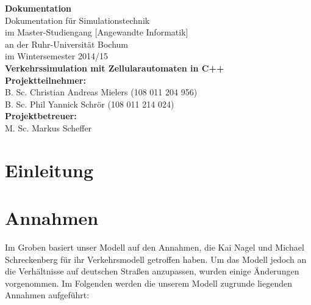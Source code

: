 \documentclass[11pt, a4paper]{article}
\begin{document}
\thispagestyle{empty}


\setlength{\hoffset}{-0.5cm} %

\begin{titlepage}
    \begin{center}
    \vphantom{0cm}
    \LARGE \textbf{Dokumentation}\\
    \vspace{3cm}
    \normalsize
    Dokumentation für Simulationstechnik \\
    im Master-Studiengang \textcolor{AI-BLUE}{[Angewandte Informatik]}\\
    an der Ruhr-Universität Bochum\\
    im Wintersemester 2014/15\\
    \vspace{4cm}
    \huge \textbf{Verkehrssimulation mit Zellularautomaten in C++} \\
    \vspace{4cm}
    \normalsize
    \textbf{Projektteilnehmer:}\\
    B. Sc. Christian Andreas Mielers (108 011 204 956)\\
    B. Sc. Phil Yannick Schrör (108 011 214 024)\\
    \vspace{2cm}
    \textbf{Projektbetreuer:}\\
    M. Sc. Markus Scheffer
    \end{center}
\end{titlepage}

\newpage
\tableofcontents

\newpage
{}

\section{Einleitung}
\label{sec:einleitung}

\newpage
\section{Annahmen}
\label{sec:ansatz}

Im Groben basiert unser Modell auf den Annahmen, die Kai Nagel und Michael Schreckenberg \cite{nagel-schreckenberg} für ihr Verkehrsmodell getroffen haben. Um das Modell jedoch an die Verhältnisse auf deutschen Straßen anzupassen, wurden einige Änderungen vorgenommen.
Im Folgenden werden die unserem Modell zugrunde liegenden Annahmen aufgeführt:
\end{document}
